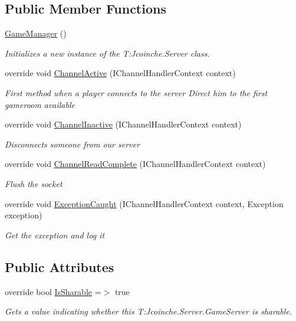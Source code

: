\subsection*{Public Member Functions}
\begin{DoxyCompactItemize}
\item 
\hyperlink{class_coinche_1_1_server_1_1_game_manager_ab9e920517c1b0486d86b0c3cdb8f2896}{Game\+Manager} ()
\begin{DoxyCompactList}\small\item\em Initializes a new instance of the T\+:\+Jcoinche.\+Server class. \end{DoxyCompactList}\item 
override void \hyperlink{class_coinche_1_1_server_1_1_game_manager_aaaa4563037a196f74811f9f35892c613}{Channel\+Active} (I\+Channel\+Handler\+Context context)
\begin{DoxyCompactList}\small\item\em First method when a player connects to the server Direct him to the first gameroom available \end{DoxyCompactList}\item 
override void \hyperlink{class_coinche_1_1_server_1_1_game_manager_a69ffe1493216ea1cdbaa0cbd2694df95}{Channel\+Inactive} (I\+Channel\+Handler\+Context context)
\begin{DoxyCompactList}\small\item\em Disconnects someone from our server \end{DoxyCompactList}\item 
override void \hyperlink{class_coinche_1_1_server_1_1_game_manager_a6f0b2a2abd6f793b8d45dcd8f41819a0}{Channel\+Read\+Complete} (I\+Channel\+Handler\+Context context)
\begin{DoxyCompactList}\small\item\em Flush the socket \end{DoxyCompactList}\item 
override void \hyperlink{class_coinche_1_1_server_1_1_game_manager_a87a33c57dcce28d543de561f7ab4134b}{Exception\+Caught} (I\+Channel\+Handler\+Context context, Exception exception)
\begin{DoxyCompactList}\small\item\em Get the exception and log it \end{DoxyCompactList}\end{DoxyCompactItemize}
\subsection*{Public Attributes}
\begin{DoxyCompactItemize}
\item 
override bool \hyperlink{class_coinche_1_1_server_1_1_game_manager_ac42b7e22b664b020a2c0daecdbf4ace3}{Is\+Sharable} =$>$ true
\begin{DoxyCompactList}\small\item\em Gets a value indicating whether this T\+:\+Jcoinche.\+Server.\+Game\+Server is sharable. \end{DoxyCompactList}\end{DoxyCompactItemize}
